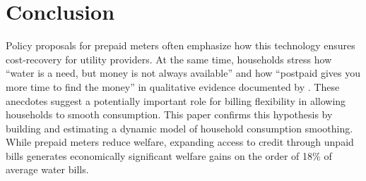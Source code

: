 \documentclass[12pt,table]{article}
\begin{document}

\section{Conclusion}\label{section:conclusion}







Policy proposals for prepaid meters often emphasize how this technology ensures cost-recovery for utility providers.  At the same time, households stress how ``water is a need, but money is not always available'' and  how ``postpaid gives you more time to find the money'' in qualitative evidence documented by \cite{heymans2014limits}.  These anecdotes suggest a potentially important role for billing flexibility in allowing households to smooth consumption.  This paper confirms this hypothesis by building and estimating a dynamic model of household consumption smoothing.  While prepaid meters reduce welfare, expanding access to credit through unpaid bills generates economically significant welfare gains on the order of 18\% of average water bills.  
\end{document}
